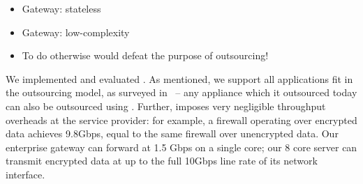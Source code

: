     \begin{itemize}
      \item Gateway: stateless
      \item Gateway: low-complexity
      \item To do otherwise would defeat the purpose of outsourcing!
    \end{itemize}


We implemented and evaluated \sys. As mentioned, we support all applications fit in the outsourcing model, as surveyed in~\cite{aplomb} -- any appliance which it outsourced today can also be outsourced using \sys.
Further, \sys imposes very negligible throughput overheads at the service provider: for example, a firewall operating over encrypted data achieves 9.8Gbps, equal to the same firewall over unencrypted data.
Our enterprise gateway can forward at 1.5 Gbps on a single core; our 8 core server can transmit \sys encrypted data at up to the full 10Gbps line rate of its network interface.
